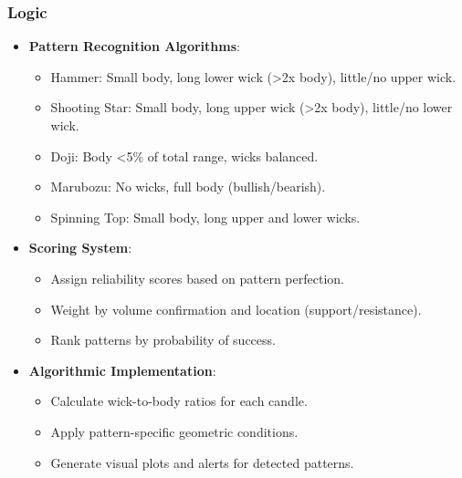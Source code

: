 \documentclass[12pt]{article}
\begin{document}
\subsubsection{Logic}
\begin{itemize}
\item \textbf{Pattern Recognition Algorithms}:
  \begin{itemize}
  \item Hammer: Small body, long lower wick (>2x body), little/no upper wick.
  \item Shooting Star: Small body, long upper wick (>2x body), little/no lower wick.
  \item Doji: Body <5\% of total range, wicks balanced.
  \item Marubozu: No wicks, full body (bullish/bearish).
  \item Spinning Top: Small body, long upper and lower wicks.
  \end{itemize}
\item \textbf{Scoring System}:
  \begin{itemize}
  \item Assign reliability scores based on pattern perfection.
  \item Weight by volume confirmation and location (support/resistance).
  \item Rank patterns by probability of success.
  \end{itemize}
\item \textbf{Algorithmic Implementation}:
  \begin{itemize}
  \item Calculate wick-to-body ratios for each candle.
  \item Apply pattern-specific geometric conditions.
  \item Generate visual plots and alerts for detected patterns.
  \end{itemize}
\end{itemize}
\end{document}
